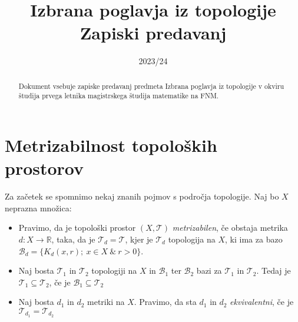 \documentclass[a4paper, 10pt]{article}
\title{Izbrana poglavja iz topologije \\ Zapiski predavanj}
\date{2023/24}
\newcommand{\mth}[1]{\ensuremath{\mathbb{#1}}}
\newcommand{\R}{\mth{R}}
\newcommand{\pojem}[1]{\emph{#1}}
\newcommand{\map}[3]{\ensuremath{{#1}: {#2} \rightarrow {#3}}}
\begin{document}
	\maketitle
	\newpage
	\begin{abstract}
		\noindent Dokument vsebuje zapiske predavanj predmeta Izbrana poglavja iz topologije v okviru študija prvega letnika magistrskega študija matematike na FNM.
	\end{abstract}
	\tableofcontents
	\newpage
	\section{Metrizabilnost topoloških prostorov}
	Za začetek se spomnimo nekaj znanih pojmov s področja topologije. Naj bo $X$ neprazna množica: \begin{itemize}
		\item Pravimo, da je topološki prostor $(X, \mathcal{T})$ \pojem{metrizabilen}, če obstaja metrika $\map{d}{X}{\R}$, taka, da je $\mathcal{T}_d = \mathcal{T}$, kjer je $\mathcal{T}_d$ topologija na $X$, ki ima za bazo $\mathcal{B}_d = \{K_d(x, r);~x\in X ~\&~r>0\}$.
		\item Naj bosta $\mathcal{T}_1$ in $\mathcal{T}_2$ topologiji na $X$ in $\mathcal{B}_1$ ter $\mathcal{B}_2$ bazi za $\mathcal{T}_1$ in $\mathcal{T}_2$. Tedaj je $\mathcal{T}_1 \subseteq \mathcal{T}_2$, če je $\mathcal{B}_1 \subseteq \mathcal{T}_2$
		\item Naj bosta $d_1$ in $d_2$ metriki na $X$. Pravimo, da sta $d_1$ in $d_2$ \pojem{ekvivalentni}, če je $\mathcal{T}_{d_1} = \mathcal{T}_{d_2}$
	\end{itemize}
	
\end{document}
